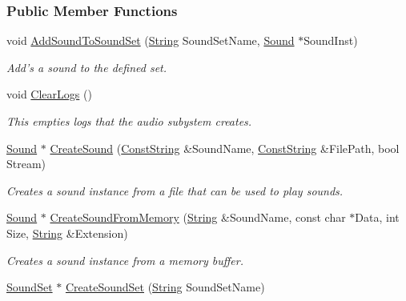 \subsubsection*{Public Member Functions}
\begin{DoxyCompactItemize}
\item 
void \hyperlink{classphys_1_1SoundManager_a89c05a5628e187939ea30b0e4b149931}{AddSoundToSoundSet} (\hyperlink{namespacephys_aa03900411993de7fbfec4789bc1d392e}{String} SoundSetName, \hyperlink{classphys_1_1Sound}{Sound} $\ast$SoundInst)
\begin{DoxyCompactList}\small\item\em Add's a sound to the defined set. \item\end{DoxyCompactList}\item 
void \hyperlink{classphys_1_1SoundManager_acc3551bcda7b1c681d83d81cc25747ae}{ClearLogs} ()
\begin{DoxyCompactList}\small\item\em This empties logs that the audio subystem creates. \item\end{DoxyCompactList}\item 
\hyperlink{classphys_1_1Sound}{Sound} $\ast$ \hyperlink{classphys_1_1SoundManager_a4504934e7a6a75045f0a8d303b7be0b8}{CreateSound} (\hyperlink{namespacephys_a5ce5049f8b4bf88d6413c47b504ebb31}{ConstString} \&SoundName, \hyperlink{namespacephys_a5ce5049f8b4bf88d6413c47b504ebb31}{ConstString} \&FilePath, bool Stream)
\begin{DoxyCompactList}\small\item\em Creates a sound instance from a file that can be used to play sounds. \item\end{DoxyCompactList}\item 
\hyperlink{classphys_1_1Sound}{Sound} $\ast$ \hyperlink{classphys_1_1SoundManager_aa039c3d7a5ee961be0934a58fd3826fa}{CreateSoundFromMemory} (\hyperlink{namespacephys_aa03900411993de7fbfec4789bc1d392e}{String} \&SoundName, const char $\ast$Data, int Size, \hyperlink{namespacephys_aa03900411993de7fbfec4789bc1d392e}{String} \&Extension)
\begin{DoxyCompactList}\small\item\em Creates a sound instance from a memory buffer. \item\end{DoxyCompactList}\item 
\hyperlink{classphys_1_1SoundSet}{SoundSet} $\ast$ \hyperlink{classphys_1_1SoundManager_afccb11a6f6d9aa9768a185febb0af45a}{CreateSoundSet} (\hyperlink{namespacephys_aa03900411993de7fbfec4789bc1d392e}{String} SoundSetName)

\end{DoxyCompactItemize}
